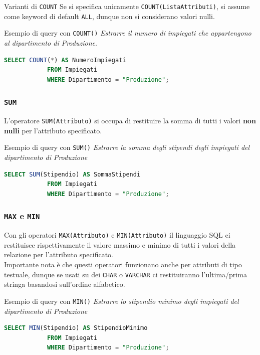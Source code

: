 \documentclass[12pt]{report}
\begin{document}
	\begin{osservazione}{Varianti di \texttt{COUNT}}{}
		Se si specifica unicamente \texttt{COUNT(ListaAttributi)}, si assume come keyword di default \texttt{ALL}, dunque non si considerano valori nulli.
	\end{osservazione}
	
	\begin{esempio}{Esempio di query con \texttt{COUNT()}}{}
		\textit{Estrarre il numero di impiegati che appartengono al dipartimento di Produzione}.
		\begin{lstlisting}[language=SQL]
			SELECT COUNT(*) AS NumeroImpiegati
			FROM Impiegati
			WHERE Dipartimento = "Produzione";
		\end{lstlisting}
	\end{esempio}
	
	\subsubsection*{\texttt{SUM}}
	L'operatore \texttt{SUM(Attributo)} si occupa di restituire la somma di tutti i valori \textbf{non nulli} per l'attributo specificato.
	\begin{esempio}{Esempio di query con \texttt{SUM()}}{}
		\textit{Estrarre la somma degli stipendi degli impiegati del dipartimento di Produzione}
		\begin{lstlisting}[language=SQL]
			SELECT SUM(Stipendio) AS SommaStipendi
			FROM Impiegati
			WHERE Dipartimento = "Produzione";
		\end{lstlisting}
	\end{esempio}
	
	\subsubsection*{\texttt{MAX} e \texttt{MIN}}
	Con gli operatori \texttt{MAX(Attributo)} e \texttt{MIN(Attributo)} il linguaggio SQL ci restituisce rispettivamente il valore massimo e minimo di tutti i valori della relazione per l'attributo specificato.\\
	Importante nota è che questi operatori funzionano anche per attributi di tipo testuale, dunque se usati su dei \texttt{CHAR} o \texttt{VARCHAR} ci restituiranno l'ultima/prima stringa basandosi sull'ordine alfabetico.
	
	\begin{esempio}{Esempio di query con \texttt{MIN()}}{}
		\textit{Estrarre lo stipendio minimo degli impiegati del dipartimento di Produzione}
		\begin{lstlisting}[language=SQL]
			SELECT MIN(Stipendio) AS StipendioMinimo
			FROM Impiegati
			WHERE Dipartimento = "Produzione";
		\end{lstlisting}
	\end{esempio}
	
\end{document}
